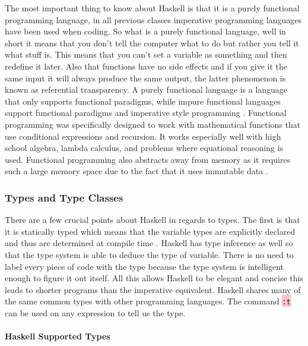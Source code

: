 \documentclass{article}
\begin{document}
The most important thing to know about Haskell is that it is a purely functional programming language, in all previous classes imperative programming languages have been used when coding. So what is a purely functional language, well in short it means that you don't tell the computer what to do but rather you tell it what stuff is. This means that you can't set a variable as something and then redefine it later. Also that functions have no side effects and if you give it the same input it will always produce the same output, the latter phenomenon is known as referential transparency. A purely functional language is a language that only supports functional paradigms, while impure functional languages support functional paradigms and imperative style programming \cite{FPI}. Functional programming was specifically designed to work with mathematical functions that use conditional expressions and recursion. It works especially well with high school algebra, lambda calculus, and problems where equational reasoning is used. Functional programming also abstracts away from memory as it requires such a large memory space due to the fact that it uses immutable data \cite{FPI}. 

\subsubsection{Types and Type Classes}
There are a few crucial points about Haskell in regards to types. The first is that it is statically typed which means that the variable types are explicitly declared and thus are determined at compile time \cite{TT}. Haskell has type inference as well so that the type system is able to deduce the type of variable. There is no need to label every piece of code with the type because the type system is intelligent enough to figure it out itself. All this allows Haskell to be elegant and concise this leads to shorter programs than the imperative equivalent. Haskell shares many of the same common types with other programming languages. The command \colorbox{pink}{ \lstinline{:t}} can be used on any expression to tell us the type. 

\paragraph{Haskell Supported Types} 
\end{document}
